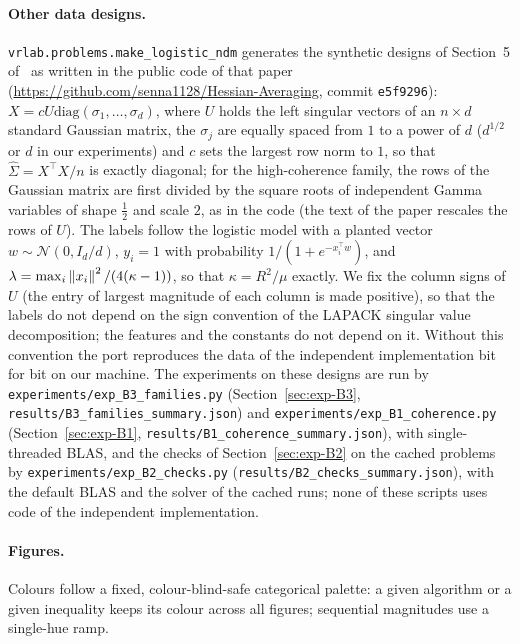 \paragraph{Other data designs.}
\nolinkurl{vrlab.problems.make_logistic_ndm} generates the synthetic designs of Section~5 of~\cite{na2023hessian} as
written in the public code of that paper (\url{https://github.com/senna1128/Hessian-Averaging}, commit
\texttt{e5f9296}): $X=cU\mathrm{diag}(\sigma_1,\dots,\sigma_d)$, where $U$ holds the left singular vectors of an
$n\times d$ standard Gaussian matrix, the $\sigma_j$ are equally spaced from $1$ to a power of $d$ ($d^{1/2}$ or $d$ in
our experiments) and $c$ sets the largest row norm to $1$, so that $\hat\Sigma=X^\top X/n$ is exactly diagonal; for the
high-coherence family, the rows of the Gaussian matrix are first divided by the square roots of independent Gamma
variables of shape $\frac12$ and scale $2$, as in the code (the text of the paper rescales the rows of $U$). The labels
follow the logistic model with a planted vector $w\sim\mathcal N(0,I_d/d)$, $y_i=1$ with probability
$1/(1+e^{-x_i^\top w})$, and $\lambda=\max_i\left\|x_i\right\|^2/(4(\kappa-1))$, so that $\kappa=R^2/\mu$ exactly. We fix the
column signs of $U$ (the entry of largest magnitude of each column is made positive), so that the labels do not depend
on the sign convention of the LAPACK singular value decomposition; the features and the constants do not depend on it.
Without this convention the port reproduces the data of the independent implementation bit for bit on our machine. The
experiments on these designs are run by \nolinkurl{experiments/exp_B3_families.py} (Section~\ref{sec:exp-B3},
\nolinkurl{results/B3_families_summary.json}) and \nolinkurl{experiments/exp_B1_coherence.py}
(Section~\ref{sec:exp-B1}, \nolinkurl{results/B1_coherence_summary.json}), with single-threaded BLAS, and the checks of
Section~\ref{sec:exp-B2} on the cached problems by \nolinkurl{experiments/exp_B2_checks.py}
(\nolinkurl{results/B2_checks_summary.json}), with the default BLAS and the solver of the cached runs; none of these
scripts uses code of the independent implementation.

\paragraph{Figures.} Colours follow a fixed, colour-blind-safe categorical palette: a given algorithm or a given
inequality keeps its colour across all figures; sequential magnitudes use a single-hue ramp.
